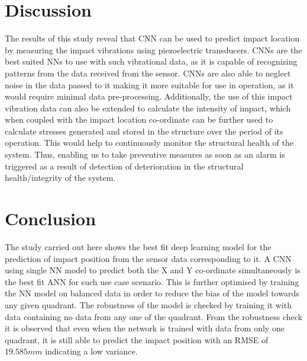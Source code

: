 \documentclass[12pt]{article}
\begin{document}
\section{Discussion}
The results of this study reveal that CNN can be used to predict impact location by measuring the impact vibrations using piezoelectric transducers. CNNs are the best suited NNs to use with such vibrational data, as it is capable of recognizing patterns from the data received from the sensor. CNNs are also able to neglect noise in the data passed to it making it more suitable for use in operation, as it would require minimal data pre-processing. Additionally, the use of this impact vibration data can also be extended to calculate the intensity of impact, which when coupled with the impact location co-ordinate can be further used to calculate stresses generated and stored in the structure over the period of its operation. This would help to continuously monitor the structural health of the system. Thus, enabling us to take preventive measures as soon as an alarm is triggered as a result of detection of deterioration in the structural health/integrity of the system.   

\section{Conclusion}
The study carried out here shows the best fit deep learning model for the prediction of impact position from the sensor data corresponding to it. A CNN using single NN model to predict both the X and Y co-ordinate simultaneously is the best fit ANN for such use case scenario. This is further optimised by training the NN model on balanced data in order to reduce the bias of the model towards any given quadrant. The robustness of the model is checked by training it with data containing no data from any one of the quadrant. From the robustness check it is observed that even when the network is trained with data from only one quadrant, it is still able to predict the impact position with an RMSE of $19.585 mm$ indicating a low variance.   
\end{document}
